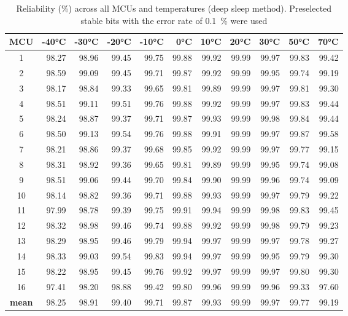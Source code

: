 \begin{table}[ht!]
    \centering
    \begin{tabular}{c||rrrrrrrrrr}
    \toprule
    \textbf{MCU} & \textbf{-40°C} & \textbf{-30°C} & \textbf{-20°C} & \textbf{-10°C} & \textbf{0°C} & \textbf{10°C} & \textbf{20°C} & \textbf{30°C} & \textbf{50°C} & \textbf{70°C} \\
    \midrule
    1    &  98.27 &  98.96 &  99.45 &  99.75 & 99.88 & 99.92 & 99.99 & 99.97 & 99.83 & 99.42 \\
    2    &  98.59 &  99.09 &  99.45 &  99.71 & 99.87 & 99.92 & 99.99 & 99.95 & 99.74 & 99.19 \\
    3    &  98.17 &  98.84 &  99.33 &  99.65 & 99.81 & 99.89 & 99.99 & 99.97 & 99.81 & 99.30 \\
    4    &  98.51 &  99.11 &  99.51 &  99.76 & 99.88 & 99.92 & 99.99 & 99.97 & 99.83 & 99.44 \\
    5    &  98.24 &  98.87 &  99.37 &  99.71 & 99.87 & 99.93 & 99.99 & 99.98 & 99.84 & 99.44 \\
    6    &  98.50 &  99.13 &  99.54 &  99.76 & 99.88 & 99.91 & 99.99 & 99.97 & 99.87 & 99.58 \\
    7    &  98.21 &  98.86 &  99.37 &  99.68 & 99.85 & 99.92 & 99.99 & 99.97 & 99.77 & 99.15 \\
    8    &  98.31 &  98.92 &  99.36 &  99.65 & 99.81 & 99.89 & 99.99 & 99.95 & 99.74 & 99.08 \\
    9    &  98.51 &  99.06 &  99.44 &  99.70 & 99.84 & 99.90 & 99.99 & 99.96 & 99.74 & 99.09 \\
    10   &  98.14 &  98.82 &  99.36 &  99.71 & 99.88 & 99.93 & 99.99 & 99.97 & 99.79 & 99.22 \\
    11   &  97.99 &  98.78 &  99.39 &  99.75 & 99.91 & 99.94 & 99.99 & 99.98 & 99.83 & 99.45 \\
    12   &  98.32 &  98.98 &  99.46 &  99.74 & 99.88 & 99.92 & 99.99 & 99.98 & 99.79 & 99.23 \\
    13   &  98.29 &  98.95 &  99.46 &  99.79 & 99.94 & 99.97 & 99.99 & 99.97 & 99.78 & 99.27 \\
    14   &  98.33 &  99.03 &  99.54 &  99.83 & 99.94 & 99.97 & 99.99 & 99.95 & 99.79 & 99.30 \\
    15   &  98.22 &  98.95 &  99.45 &  99.76 & 99.92 & 99.97 & 99.99 & 99.97 & 99.80 & 99.30 \\
    16   &  97.41 &  98.20 &  98.88 &  99.42 & 99.80 & 99.96 & 99.99 & 99.96 & 99.33 & 97.60 \\
    \textbf{mean} &  98.25 &  98.91 &  99.40 &  99.71 & 99.87 & 99.93 & 99.99 & 99.97 & 99.77 & 99.19 \\
    \bottomrule
    \end{tabular}
    \captionsetup{justification=centering,margin=0.5cm}
    \caption{Reliability (\%) across all MCUs and temperatures (deep sleep method). Preselected stable bits with the error rate of 0.1~\% were used}
    \label{table:reliability_stable_bits}
    \vspace{-1.5em}
\end{table}

